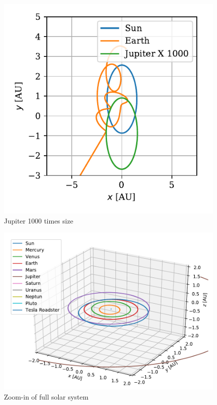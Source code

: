 \documentclass[twocolumn]{aastex62}
\begin{document}
\begin{figure}
\includegraphics[scale=1]{Figures/jupiter1000.pdf}
\caption{Jupiter 1000 times size}
\label{fig:jupiter1000}
\end{figure}

\begin{figure}
\includegraphics[scale=1]{Figures/InnerSolarSystem.pdf}
\caption{Zoom-in of full solar system}
\label{fig:outer}
\end{figure}
\end{document}
